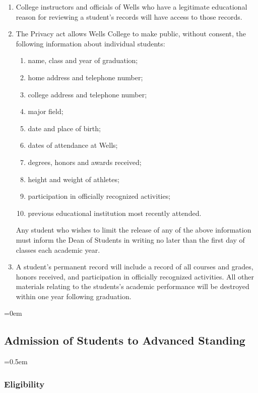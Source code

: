 \documentclass{manual}
\newcommand{\oldbreak}[1]{}
\let\oldsubsection\subsection
\renewcommand\subsection{\leftskip=0em\oldsubsection}
\let\oldsubsubsection\subsubsection
\renewcommand\subsubsection{\leftskip=0.5em\oldsubsubsection}
\newcommand{\itemLevelA}{\alph*.}
\newcommand{\itemLevelB}{\arabic*)}
\newcommand{\itemRefA}{\alph*}
\newcommand{\itemRefB}{\arabic*}
\begin{document}
\begin{enumerate}[label=\itemLevelA,ref=\itemRefA]
\begin{enumerate}[label=\itemLevelB,ref=\itemRefB]
\item College instructors and officials of Wells who have a legitimate educational reason for reviewing a student's records will have access to those records.

\item The Privacy act allows Wells College to make public, without consent, the following information about individual students:
\begin{enumerate}[label=\alph*)]
\item name, class and year of graduation;
\item home address and telephone number;
\item college address and telephone number;
\item major field;
\item date and place of birth;
\item dates of attendance at Wells;
\item degrees, honors and awards received;
\item height and weight of athletes;
\item participation in officially recognized activities;
\item previous educational institution most recently attended.
\end{enumerate}

Any student who wishes to limit the release of any of the above information must inform the Dean of Students in writing no later than the first day of classes each academic year.

\item A student's permanent record will include a record of all courses and grades, honors received, and participation in officially recognized activities. All other materials relating to the students's academic performance will be destroyed within one year following graduation.

\end{enumerate}
\end{enumerate}
\oldbreak{VII-8}

\subsection{Admission of Students to Advanced Standing}\label{sec:AdmissionOfStudentsToAdvancedStanding}
\subsubsection{Eligibility}
\end{document}
